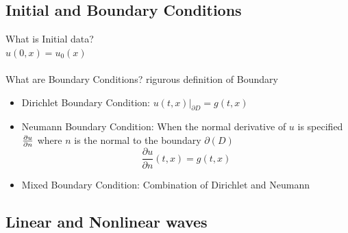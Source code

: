 \subsection{Initial and Boundary Conditions}
What is Initial data?
\\$u(0,x)=u_0(x)$
\\
\\What are Boundary Conditions?
rigurous definition of Boundary
\begin{itemize}
    \item Dirichlet Boundary Condition: $u(t,x)|_{\partial{D}}=g(t,x)$
    \item Neumann Boundary Condition: When the normal derivative of $u$ is specified $\pdv{u}{n}$ where $n$ is the normal to the boundary $\partial(D)$
    \[\frac{\partial u}{\partial n}(t,x) = g(t,x)\]
    \item Mixed Boundary Condition: Combination of Dirichlet and Neumann
\end{itemize}
\subsection{Linear and Nonlinear waves}
